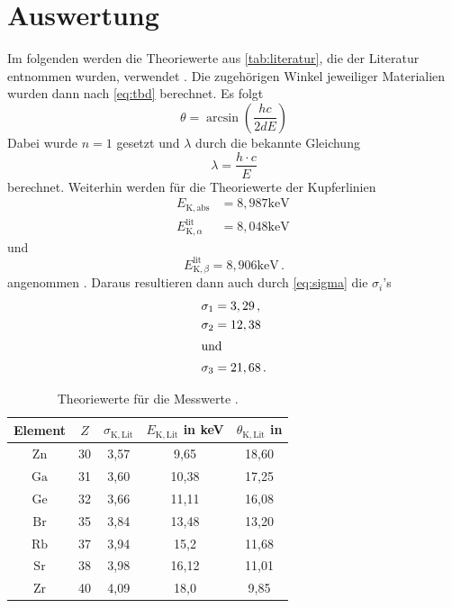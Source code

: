 \section{Auswertung}
\label{sec:Auswertung}


Im folgenden werden die Theoriewerte aus \autoref{tab:literatur}, die der Literatur entnommen wurden, verwendet \cite{x_ray_database}.
Die zugehörigen Winkel jeweiliger Materialien wurden dann nach \autoref{eq:tbd} berechnet.
Es folgt 
\begin{equation*}
  \theta = \arcsin \left( \frac{h c}{2 d E} \right)
\end{equation*}
Dabei wurde $n = 1$ gesetzt und $\lambda$ durch die bekannte Gleichung 
\begin{equation*}
  \lambda = \frac{h \cdot c}{E}
\end{equation*}
berechnet.
Weiterhin werden für die Theoriewerte der Kupferlinien
\begin{align*}
  E_{\mathrm{K}, \mathrm{abs}} &=8,987 \mathrm{keV} \, \\
  E_{\mathrm{K}, \alpha}^{\mathrm{lit}} &=8,048 \mathrm{keV} 
\end{align*}
und
\begin{equation*}
  E_{\mathrm{K}, \beta}^{\mathrm{lit}} =8,906 \mathrm{keV} \, .
\end{equation*}
angenommen \cite{x_ray_database}.
Daraus resultieren dann auch durch \autoref{eq:sigma} die $\sigma_i$'s
\begin{align*}
  \sigma_{1} &=3,29 \, ,\\
  \sigma_{2} &=12,38 \\ 
  \intertext{und}
  \sigma_{3} &=21,68 \, .
\end{align*}
 
\begin{table}
  \centering
  \caption{Theoriewerte für die Messwerte \cite{x_ray_database}.}
  \label{tab:literatur}
  \begin{tabular}{ccccc} 
    \hline Element & $Z$ & $\sigma_{\mathrm{K, Lit}}$& $E_{\mathrm{K, Lit}}$ in keV & $\theta_{\mathrm{K, Lit}}$ in \\
    \hline $\mathrm{Zn}$ & 30 & 3,57 & 9,65 & 18,60  \\
    $\mathrm{Ga}$ & 31 & 3,60 & 10,38 & 17,25  \\
    $\mathrm{Ge}$ & 32 & 3,66 & 11,11 & 16,08  \\
    $\mathrm{Br}$ & 35 & 3,84 & 13,48 & 13,20  \\
    $\mathrm{Rb}$ & 37 & 3,94 & 15,2 & 11,68   \\
    $\mathrm{Sr}$ & 38 & 3,98 & 16,12 & 11,01  \\
    $\mathrm{Zr}$ & 40 & 4,09 & 18,0 & 9,85    \\
    \hline
  \end{tabular}
\end{table}

